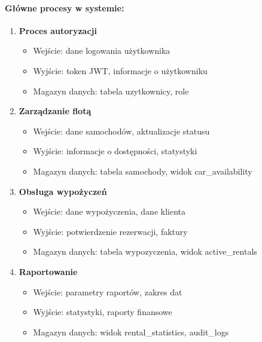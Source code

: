 \documentclass[12pt]{article}
\begin{document}
\paragraph{Główne procesy w systemie:}
\begin{enumerate}
    \item \textbf{Proces autoryzacji}
    \begin{itemize}
        \item Wejście: dane logowania użytkownika
        \item Wyjście: token JWT, informacje o użytkowniku
        \item Magazyn danych: tabela uzytkownicy, role
    \end{itemize}

    \item \textbf{Zarządzanie flotą}
    \begin{itemize}
        \item Wejście: dane samochodów, aktualizacje statusu
        \item Wyjście: informacje o dostępności, statystyki
        \item Magazyn danych: tabela samochody, widok car\_availability
    \end{itemize}

    \item \textbf{Obsługa wypożyczeń}
    \begin{itemize}
        \item Wejście: dane wypożyczenia, dane klienta
        \item Wyjście: potwierdzenie rezerwacji, faktury
        \item Magazyn danych: tabela wypozyczenia, widok active\_rentals
    \end{itemize}

    \item \textbf{Raportowanie}
    \begin{itemize}
        \item Wejście: parametry raportów, zakres dat
        \item Wyjście: statystyki, raporty finansowe
        \item Magazyn danych: widok rental\_statistics, audit\_logs
    \end{itemize}
\end{enumerate}
\end{document}
